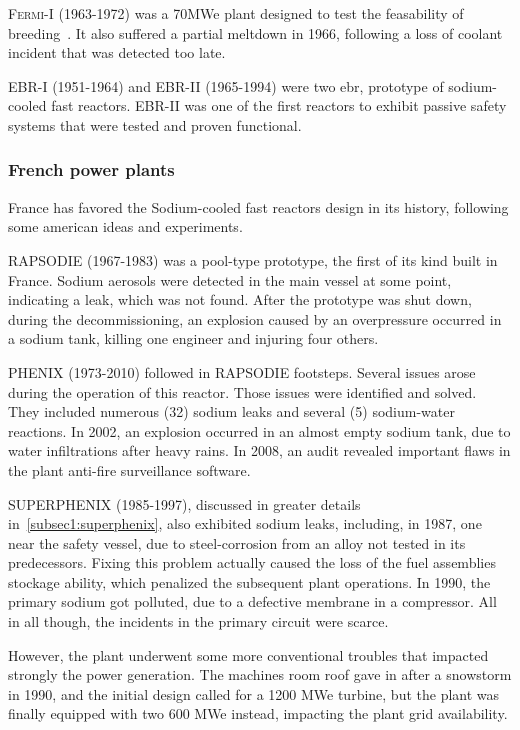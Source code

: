 \textsc{Fermi-I} (1963-1972) was a 70MWe plant designed to test the feasability of breeding~\cite{fermi1}. It also suffered a partial meltdown in 1966, following a loss of coolant incident that was detected too late.


\textsc{EBR-I} (1951-1964) and \textsc{EBR-II} (1965-1994) were two \gls{ebr}, prototype of sodium-cooled fast reactors. EBR-II was one of the first reactors to exhibit passive safety systems that were tested and proven functional.

\subsubsection{French power plants}
\label{subsubsec1:france}

France has favored the Sodium-cooled fast reactors design in its history, following some american ideas and experiments.

\textsc{RAPSODIE} (1967-1983) was a pool-type prototype, the first of its kind built in France. Sodium aerosols were detected in the main vessel at some point, indicating a leak, which was not found. After the prototype was shut down, during the decommissioning, an explosion caused by an overpressure occurred in a sodium tank, killing one engineer and injuring four others.

\textsc{PHENIX} (1973-2010) followed in RAPSODIE footsteps. Several issues arose during the operation of this reactor. Those issues were identified and solved. They included numerous (32) sodium leaks and several (5) sodium-water reactions. In 2002, an explosion occurred in an almost empty sodium tank, due to water infiltrations after heavy rains. In 2008, an audit revealed important flaws in the plant anti-fire surveillance software.

\textsc{SUPERPHENIX} (1985-1997), discussed in greater details in~\ref{subsec1:superphenix}, also exhibited sodium leaks, including, in 1987, one near the safety vessel, due to steel-corrosion from an alloy not tested in its predecessors. Fixing this problem actually caused the loss of the fuel assemblies stockage ability, which penalized the subsequent plant operations. In 1990, the primary sodium got polluted, due to a defective membrane in a compressor. All in all though, the incidents in the primary circuit were scarce.

However, the plant underwent some more conventional troubles that impacted strongly the power generation. The machines room roof gave in after a snowstorm in 1990, and the initial design called for a 1200 MWe turbine, but the plant was finally equipped with two 600 MWe instead, impacting the plant grid availability.



